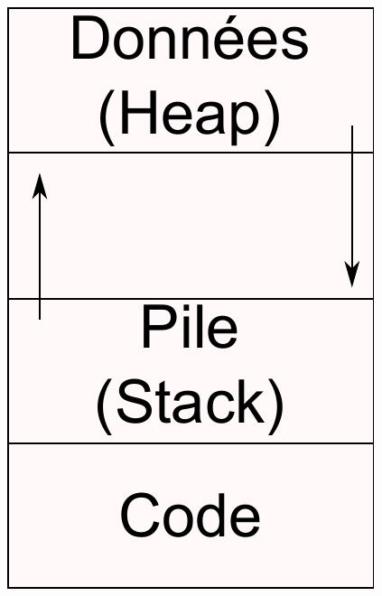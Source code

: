 \begin{frame}{\sectitle}
\begin{columns}[c]
\includegraphics[width=\textwidth]{images/Workspace.pdf}
\end{columns}
\end{frame}

\def\subsectitle{La zone u}
